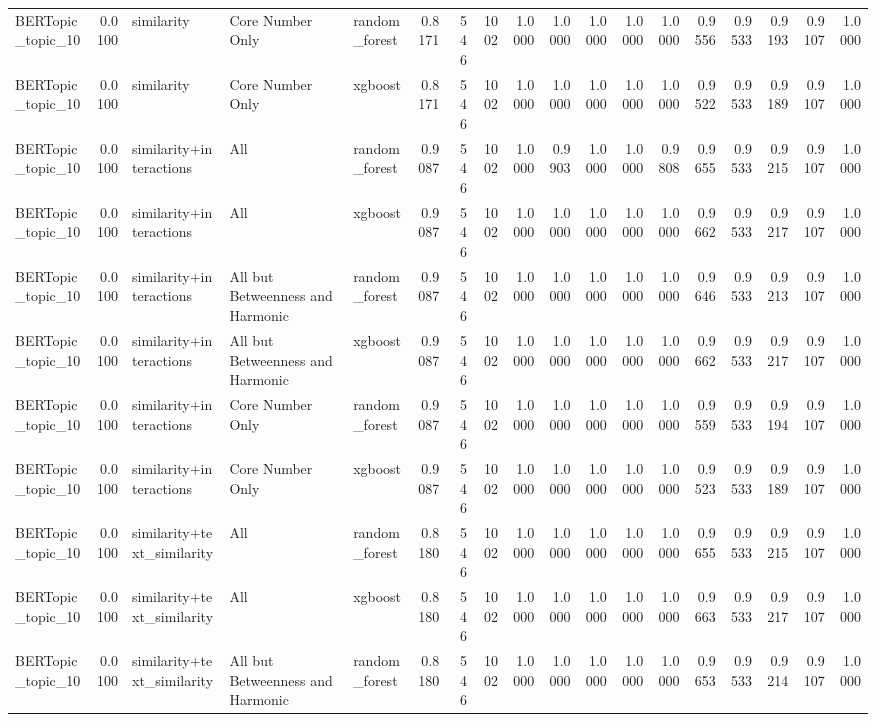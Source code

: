 \begin{tabular}{lrlllrrrrrrrrrrrrr}
BERTopic_topic_10 & 0.0100 & similarity & Core Number Only & random_forest & 0.8171 & 546 & 1002 & 1.0000 & 1.0000 & 1.0000 & 1.0000 & 1.0000 & 0.9556 & 0.9533 & 0.9193 & 0.9107 & 1.0000 \\
BERTopic_topic_10 & 0.0100 & similarity & Core Number Only & xgboost & 0.8171 & 546 & 1002 & 1.0000 & 1.0000 & 1.0000 & 1.0000 & 1.0000 & 0.9522 & 0.9533 & 0.9189 & 0.9107 & 1.0000 \\
BERTopic_topic_10 & 0.0100 & similarity+interactions & All & random_forest & 0.9087 & 546 & 1002 & 1.0000 & 0.9903 & 1.0000 & 1.0000 & 0.9808 & 0.9655 & 0.9533 & 0.9215 & 0.9107 & 1.0000 \\
BERTopic_topic_10 & 0.0100 & similarity+interactions & All & xgboost & 0.9087 & 546 & 1002 & 1.0000 & 1.0000 & 1.0000 & 1.0000 & 1.0000 & 0.9662 & 0.9533 & 0.9217 & 0.9107 & 1.0000 \\
BERTopic_topic_10 & 0.0100 & similarity+interactions & All but Betweenness and Harmonic & random_forest & 0.9087 & 546 & 1002 & 1.0000 & 1.0000 & 1.0000 & 1.0000 & 1.0000 & 0.9646 & 0.9533 & 0.9213 & 0.9107 & 1.0000 \\
BERTopic_topic_10 & 0.0100 & similarity+interactions & All but Betweenness and Harmonic & xgboost & 0.9087 & 546 & 1002 & 1.0000 & 1.0000 & 1.0000 & 1.0000 & 1.0000 & 0.9662 & 0.9533 & 0.9217 & 0.9107 & 1.0000 \\
BERTopic_topic_10 & 0.0100 & similarity+interactions & Core Number Only & random_forest & 0.9087 & 546 & 1002 & 1.0000 & 1.0000 & 1.0000 & 1.0000 & 1.0000 & 0.9559 & 0.9533 & 0.9194 & 0.9107 & 1.0000 \\
BERTopic_topic_10 & 0.0100 & similarity+interactions & Core Number Only & xgboost & 0.9087 & 546 & 1002 & 1.0000 & 1.0000 & 1.0000 & 1.0000 & 1.0000 & 0.9523 & 0.9533 & 0.9189 & 0.9107 & 1.0000 \\
BERTopic_topic_10 & 0.0100 & similarity+text_similarity & All & random_forest & 0.8180 & 546 & 1002 & 1.0000 & 1.0000 & 1.0000 & 1.0000 & 1.0000 & 0.9655 & 0.9533 & 0.9215 & 0.9107 & 1.0000 \\
BERTopic_topic_10 & 0.0100 & similarity+text_similarity & All & xgboost & 0.8180 & 546 & 1002 & 1.0000 & 1.0000 & 1.0000 & 1.0000 & 1.0000 & 0.9663 & 0.9533 & 0.9217 & 0.9107 & 1.0000 \\
BERTopic_topic_10 & 0.0100 & similarity+text_similarity & All but Betweenness and Harmonic & random_forest & 0.8180 & 546 & 1002 & 1.0000 & 1.0000 & 1.0000 & 1.0000 & 1.0000 & 0.9653 & 0.9533 & 0.9214 & 0.9107 & 1.0000 \\

\end{tabular}
